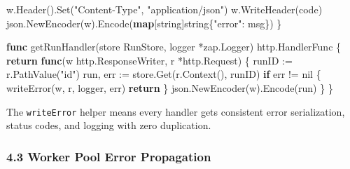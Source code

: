 \documentclass[
]{article}
\newenvironment{Shaded}{}{}
\newcommand{\ControlFlowTok}[1]{\textcolor[rgb]{0.00,0.44,0.13}{\textbf{#1}}}
\newcommand{\DataTypeTok}[1]{\textcolor[rgb]{0.56,0.13,0.00}{#1}}
\newcommand{\KeywordTok}[1]{\textcolor[rgb]{0.00,0.44,0.13}{\textbf{#1}}}
\newcommand{\NormalTok}[1]{#1}
\newcommand{\OperatorTok}[1]{\textcolor[rgb]{0.40,0.40,0.40}{#1}}
\newcommand{\OtherTok}[1]{\textcolor[rgb]{0.00,0.44,0.13}{#1}}
\newcommand{\StringTok}[1]{\textcolor[rgb]{0.25,0.44,0.63}{#1}}
\begin{document}
\begin{Shaded}
\begin{Highlighting}[]
\NormalTok{    w}\OperatorTok{.}\NormalTok{Header}\OperatorTok{().}\NormalTok{Set}\OperatorTok{(}\StringTok{"Content{-}Type"}\OperatorTok{,} \StringTok{"application/json"}\OperatorTok{)}
\NormalTok{    w}\OperatorTok{.}\NormalTok{WriteHeader}\OperatorTok{(}\NormalTok{code}\OperatorTok{)}
\NormalTok{    json}\OperatorTok{.}\NormalTok{NewEncoder}\OperatorTok{(}\NormalTok{w}\OperatorTok{).}\NormalTok{Encode}\OperatorTok{(}\KeywordTok{map}\OperatorTok{[}\DataTypeTok{string}\OperatorTok{]}\DataTypeTok{string}\OperatorTok{\{}\StringTok{"error"}\OperatorTok{:}\NormalTok{ msg}\OperatorTok{\})}
\OperatorTok{\}}

\KeywordTok{func}\NormalTok{ getRunHandler}\OperatorTok{(}\NormalTok{store RunStore}\OperatorTok{,}\NormalTok{ logger }\OperatorTok{*}\NormalTok{zap}\OperatorTok{.}\NormalTok{Logger}\OperatorTok{)}\NormalTok{ http}\OperatorTok{.}\NormalTok{HandlerFunc }\OperatorTok{\{}
    \ControlFlowTok{return} \KeywordTok{func}\OperatorTok{(}\NormalTok{w http}\OperatorTok{.}\NormalTok{ResponseWriter}\OperatorTok{,}\NormalTok{ r }\OperatorTok{*}\NormalTok{http}\OperatorTok{.}\NormalTok{Request}\OperatorTok{)} \OperatorTok{\{}
\NormalTok{        runID }\OperatorTok{:=}\NormalTok{ r}\OperatorTok{.}\NormalTok{PathValue}\OperatorTok{(}\StringTok{"id"}\OperatorTok{)}
\NormalTok{        run}\OperatorTok{,}\NormalTok{ err }\OperatorTok{:=}\NormalTok{ store}\OperatorTok{.}\NormalTok{Get}\OperatorTok{(}\NormalTok{r}\OperatorTok{.}\NormalTok{Context}\OperatorTok{(),}\NormalTok{ runID}\OperatorTok{)}
        \ControlFlowTok{if}\NormalTok{ err }\OperatorTok{!=} \OtherTok{nil} \OperatorTok{\{}
\NormalTok{            writeError}\OperatorTok{(}\NormalTok{w}\OperatorTok{,}\NormalTok{ r}\OperatorTok{,}\NormalTok{ logger}\OperatorTok{,}\NormalTok{ err}\OperatorTok{)}
            \ControlFlowTok{return}
        \OperatorTok{\}}
\NormalTok{        json}\OperatorTok{.}\NormalTok{NewEncoder}\OperatorTok{(}\NormalTok{w}\OperatorTok{).}\NormalTok{Encode}\OperatorTok{(}\NormalTok{run}\OperatorTok{)}
    \OperatorTok{\}}
\OperatorTok{\}}
\end{Highlighting}
\end{Shaded}

The \texttt{writeError} helper means every handler gets consistent error
serialization, status codes, and logging with zero duplication.

\hypertarget{worker-pool-error-propagation}{%
\subsubsection{4.3 Worker Pool Error
Propagation}\label{worker-pool-error-propagation}}
\end{document}
